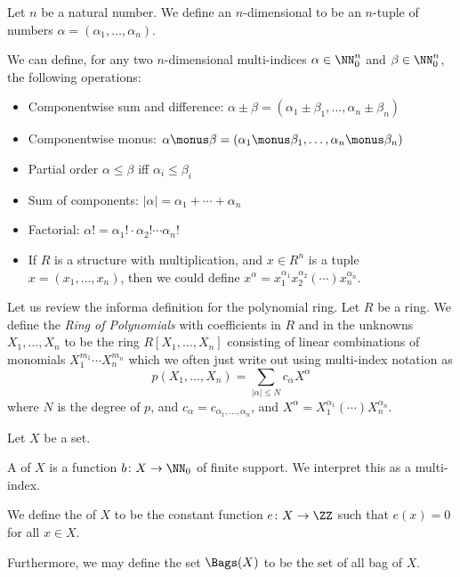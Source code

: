\begin{definition}
Let $n$ be a natural number. We define an $n$-dimensional 
to be an $n$-tuple of numbers
$\alpha=(\alpha_{1},\dots,\alpha_{n})$.

We can define, for any two $n$-dimensional multi-indices
$\alpha\in\NN_{0}^{n}$ and $\beta\in\NN_{0}^{n}$, the following
operations:
\begin{itemize}
\item Componentwise sum and difference: $\alpha\pm\beta=(\alpha_{1}\pm\beta_{1},\dots,\alpha_{n}\pm\beta_{n})$
\item Componentwise monus: $\alpha\monus\beta=(\alpha_{1}\monus\beta_{1},\dots,\alpha_{n}\monus\beta_{n})$
\item Partial order $\alpha\leq\beta$ iff $\alpha_{i}\leq\beta_{i}$
\item Sum of components: $|\alpha|=\alpha_{1}+\cdots+\alpha_{n}$
\item Factorial: $\alpha!=\alpha_{1}!\cdot\alpha_{2}!\cdots\alpha_{n}!$
\item If $R$ is a structure with multiplication, and $x\in R^{n}$ is a
  tuple $x=(x_{1},\dots,x_{n})$, then we
  could define $x^{\alpha} = x_{1}^{\alpha_{1}}x_{2}^{\alpha_{2}}(\cdots)x_{n}^{\alpha_{n}}$.
\end{itemize}
\end{definition}

\begin{remark}
Let us review the informa definition for the polynomial ring.
Let $R$ be a ring. We define the \emph{Ring of Polynomials} with
coefficients in $R$ and in the unknowns $X_{1},\dots,X_{n}$ to be the
ring $R[X_{1},\dots,X_{n}]$ consisting of linear combinations of
monomials $X_{1}^{m_{1}}\cdots X_{n}^{m_{n}}$ which we often just
write out using multi-index notation as
\begin{equation}
p(X_{1},\dots,X_{n}) = \sum_{|\alpha|\leq N} c_{\alpha}X^{\alpha}
\end{equation}
where $N$ is the degree of $p$,
and $c_{\alpha}=c_{\alpha_{1},\dots,\alpha_{n}}$,
and $X^{\alpha} = X_{1}^{\alpha_{1}}(\cdots)X_{n}^{\alpha_{n}}$. 
\end{remark}

\begin{definition}[Bags]
Let $X$ be a set.

A  of $X$ is a function $b\colon X\to\NN_{0}$
of finite support. We interpret this as a multi-index.

We define the  of $X$ to be the constant function
$e\colon X\to\ZZ$ such that $e(x)=0$ for all $x\in X$.

Furthermore, we may define the set $\Bags(X)$ to be the set of all bag
of $X$.
\end{definition}

